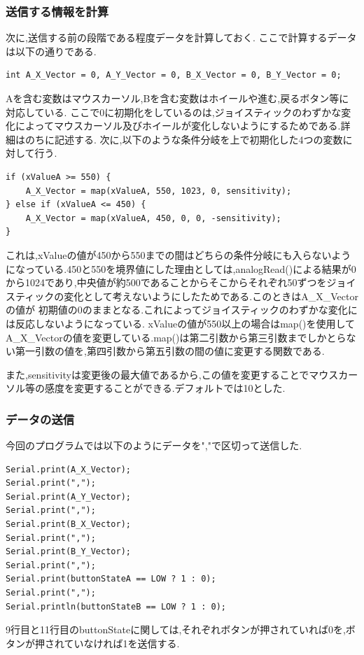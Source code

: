 \documentclass[dvipdfmx]{jarticle}
\begin{document}
\subsubsection{送信する情報を計算}
次に,送信する前の段階である程度データを計算しておく.
ここで計算するデータは以下の通りである.
\begin{lstlisting}
int A_X_Vector = 0, A_Y_Vector = 0, B_X_Vector = 0, B_Y_Vector = 0;
\end{lstlisting}
Aを含む変数はマウスカーソル,Bを含む変数はホイールや進む,戻るボタン等に対応している.
ここで0に初期化をしているのは,ジョイスティックのわずかな変化によってマウスカーソル及びホイールが変化しないようにするためである.詳細はのちに記述する.
次に,以下のような条件分岐を上で初期化した4つの変数に対して行う.
\begin{lstlisting}
if (xValueA >= 550) {
    A_X_Vector = map(xValueA, 550, 1023, 0, sensitivity);
} else if (xValueA <= 450) {
    A_X_Vector = map(xValueA, 450, 0, 0, -sensitivity);
}
\end{lstlisting}
これは,xValueの値が450から550までの間はどちらの条件分岐にも入らないようになっている.450と550を境界値にした理由としては,analogRead()による結果が0から1024であり,中央値が約500であることからそこからそれぞれ50ずつをジョイスティックの変化として考えないようにしたためである.このときはA\_X\_Vectorの値が
初期値の0のままとなる.これによってジョイスティックのわずかな変化には反応しないようになっている.
xValueの値が550以上の場合はmap()を使用してA\_X\_Vectorの値を変更している.map()は第二引数から第三引数までしかとらない第一引数の値を,第四引数から第五引数の間の値に変更する関数である.\cite{4}

また,sensitivityは変更後の最大値であるから,この値を変更することでマウスカーソル等の感度を変更することができる.デフォルトでは10とした.
\subsubsection{データの送信}
今回のプログラムでは以下のようにデータを","で区切って送信した.
\begin{lstlisting}
Serial.print(A_X_Vector);
Serial.print(",");
Serial.print(A_Y_Vector);
Serial.print(",");
Serial.print(B_X_Vector);
Serial.print(",");
Serial.print(B_Y_Vector);
Serial.print(",");
Serial.print(buttonStateA == LOW ? 1 : 0); 
Serial.print(",");
Serial.println(buttonStateB == LOW ? 1 : 0);
\end{lstlisting}
9行目と11行目のbuttonStateに関しては,それぞれボタンが押されていれば0を,ボタンが押されていなければ1を送信する.
\end{document}
